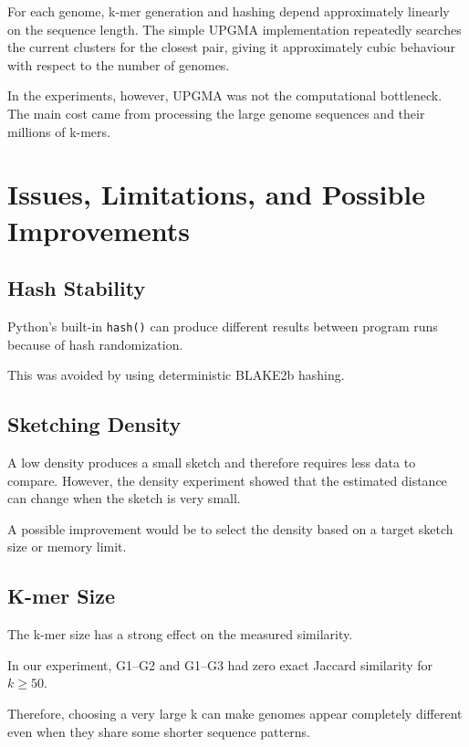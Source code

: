\documentclass[11pt,a4paper]{article}
\begin{document}
For each genome, k-mer generation and hashing depend approximately linearly
on the sequence length. The simple UPGMA implementation repeatedly searches
the current clusters for the closest pair, giving it approximately cubic
behaviour with respect to the number of genomes.

In the experiments, however, UPGMA was not the computational bottleneck.
The main cost came from processing the large genome sequences and their
millions of k-mers.


\section{Issues, Limitations, and Possible Improvements}

\subsection{Hash Stability}

Python's built-in \texttt{hash()} can produce different results between
program runs because of hash randomization.

This was avoided by using deterministic BLAKE2b hashing.

\subsection{Sketching Density}

A low density produces a small sketch and therefore requires less data to
compare. However, the density experiment showed that the estimated distance
can change when the sketch is very small.

A possible improvement would be to select the density based on a target sketch
size or memory limit.

\subsection{K-mer Size}

The k-mer size has a strong effect on the measured similarity.

In our experiment, G1--G2 and G1--G3 had zero exact Jaccard similarity for
$k\geq50$.

Therefore, choosing a very large k can make genomes appear completely
different even when they share some shorter sequence patterns.
\end{document}
